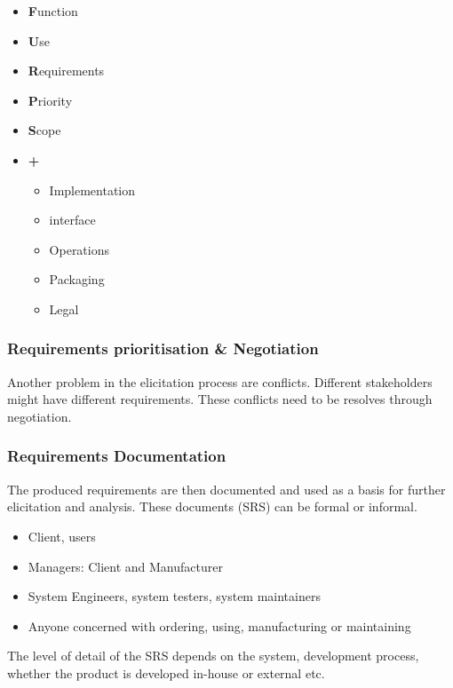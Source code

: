 \documentclass[
../../Software_Engineering_Summary.tex,
]
{subfiles}
\begin{document}
\begin{greenbox*}
    \begin{itemize}
        \item \textbf{F}unction
        \item \textbf{U}se
        \item \textbf{R}equirements
        \item \textbf{P}riority
        \item \textbf{S}cope
        \item \textbf{+}
        \begin{itemize}
            \item Implementation
            \item interface
            \item Operations
            \item Packaging
            \item Legal
        \end{itemize}
    \end{itemize}
\end{greenbox*}

\subsubsection{Requirements prioritisation \& Negotiation}
Another problem in the elicitation process are conflicts. Different stakeholders might have different requirements. These conflicts need to be resolves through negotiation.

\newpage
\subsubsection{Requirements Documentation}
The produced requirements are then documented and used as a basis for further elicitation and analysis. These documents (SRS) can be formal or informal.

\begin{greenbox}
    \begin{itemize}
        \item Client, users
        \item Managers: Client and Manufacturer
        \item System Engineers, system testers, system maintainers
        \item Anyone concerned with ordering, using, manufacturing or maintaining
    \end{itemize}
    The level of detail of the SRS depends on the system, development process, whether the product is developed in-house or external etc.
\end{greenbox}
\end{document}
